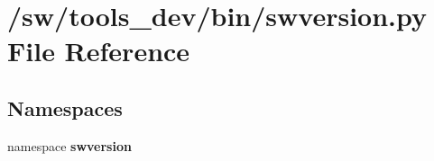 \section{/sw/tools\_\-dev/bin/swversion.py File Reference}
\label{swversion_8py}
\subsection*{Namespaces}
\begin{CompactItemize}
\item 
namespace {\bf swversion}
\end{CompactItemize}
